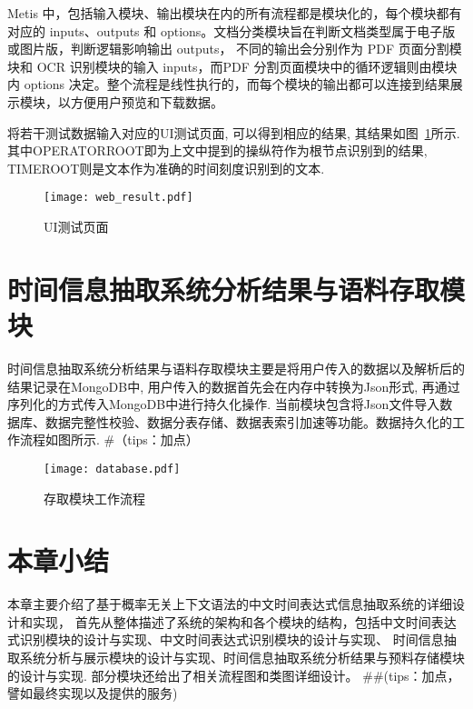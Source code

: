 Metis 中，包括输入模块、输出模块在内的所有流程都是模块化的，每个模块都有对应的 inputs、outputs 和 options。文档分类模块旨在判断文档类型属于电子版或图片版，判断逻辑影响输出 outputs，
不同的输出会分别作为 PDF 页面分割模块和 OCR 识别模块的输入 inputs，而PDF 分割页面模块中的循环逻辑则由模块内 options 决定。整个流程是线性执行的，而每个模块的输出都可以连接到结果展示模块，以方便用户预览和下载数据。

将若干测试数据输入对应的UI测试页面, 可以得到相应的结果, 其结果如图~\ref{fig:web_result}所示. 其中OPERATORROOT即为上文中提到的操纵符作为根节点识别到的结果, TIMEROOT则是文本作为准确的时间刻度识别到的文本.


\begin{figure}[h]
    \centering
    \texttt{[image: web\_result.pdf]}
    \caption{UI测试页面}
    \label{fig:web_result}
\end{figure}


\section{时间信息抽取系统分析结果与语料存取模块}


时间信息抽取系统分析结果与语料存取模块主要是将用户传入的数据以及解析后的结果记录在MongoDB中, 用户传入的数据首先会在内存中转换为Json形式, 再通过序列化的方式传入MongoDB中进行持久化操作. 
当前模块包含将Json文件导入数据库、数据完整性校验、数据分表存储、数据表索引加速等功能。数据持久化的工作流程如图所示.
#（tips：加点）


\begin{figure}[h]
    \centering
    \texttt{[image: database.pdf]}
    \caption{存取模块工作流程}
    \label{fig:database}
\end{figure}






\section{本章小结}

本章主要介绍了基于概率无关上下文语法的中文时间表达式信息抽取系统的详细设计和实现，
首先从整体描述了系统的架构和各个模块的结构，包括中文时间表达式识别模块的设计与实现、中文时间表达式识别模块的设计与实现、
时间信息抽取系统分析与展示模块的设计与实现、时间信息抽取系统分析结果与预料存储模块的设计与实现.
部分模块还给出了相关流程图和类图详细设计。
##(tips：加点，譬如最终实现以及提供的服务)

